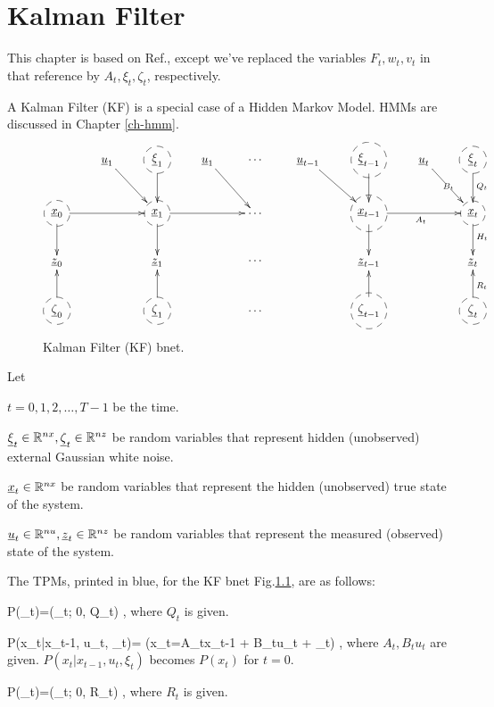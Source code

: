 \chapter{Kalman Filter}\label{ch-kalman}

This
chapter is based on Ref.\cite{wiki-kalman},
except we've replaced the
variables $F_t, w_t, v_t$ in that reference by 
$A_t, \xi_t,\zeta_t$, respectively.

A Kalman Filter (KF) is a special case of a
Hidden Markov Model. HMMs are
 discussed in Chapter \ref{ch-hmm}.

\begin{figure}[h!]
\centering
$$\xymatrix{
&\rvu_1\ar[dr]
&*++[F-o]{\rvxi_1}\ar[d]
&\rvu_1\ar[dr]
&\cdots
&\rvu_{t-1}\ar[dr]
&*++[F-o]{\rvxi_{t-1}}\ar[d]
&\rvu_t\ar[dr]|{B_t}
&*++[F-o]{\rvxi_{t}}\ar[d]^{Q_t}
\\
*++[F-o]{\rvx_0}\ar[d]\ar[rr]
&&*++[F-o]{\rvx_1}\ar[d]\ar[rr]
&&\cdots
&&*++[F-o]{\rvx_{t-1}}\ar[d]\ar[rr]_{A_t}
&&*++[F-o]{\rvx_{t}}\ar[d]^{H_t}
\\
\rvz_0
&&\rvz_1
&&\cdots
&&\rvz_{t-1}
&
&\rvz_{t}
\\
*++[F-o]{\rvzeta_0}\ar[u]
&&*++[F-o]{\rvzeta_1}\ar[u]
&&\cdots
&&*++[F-o]{\rvzeta_{t-1}}\ar[u]
&&*++[F-o]{\rvzeta_{t}}\ar[u]_{R_t}
}$$
\caption{Kalman Filter (KF) bnet.}
\label{fig-kal}
\end{figure}

Let 

$t=0, 1, 2, \dots , T-1$ be the time.

${\underline{\xi}}_t\in{ \mathbb{R}}^{nx},
 {\underline{\zeta}}_t\in { \mathbb{R}}^{nz}$ be
random variables that represent
hidden (unobserved)   external
Gaussian white noise.

${\underline{x}}_t\in { \mathbb{R}}^{nx}$ be
random variables that represent
the hidden (unobserved) true
state of the system.

${\underline{u}}_t\in { \mathbb{R}}^{nu}, 
{\underline{z}}_t\in { \mathbb{R}}^{nz}$ be
random variables that represent
the measured (observed) 
state of the system.


The TPMs, printed in blue,
for the KF bnet Fig.\ref{fig-kal},
are as follows:

\beq\color{blue}
P(\xi_t)=\caln(\xi_t; 0, Q_t)
\;,
\eeq
where $Q_t$ is given.


\beq\color{blue}
P(x_t|x_{t-1}, u_t, \xi_t)=
\indi(x_t=A_tx_{t-1} + B_tu_t + \xi_t)
\;,
\eeq
where $A_t, B_tu_t$
are given. $P(x_t|x_{t-1}, u_t, \xi_t)$
 becomes $P(x_t)$
for $t=0$.

\beq\color{blue}
P(\zeta_t)=\caln(\zeta_t; 0, R_t)
\;,
\eeq
where $R_t$ is given.

